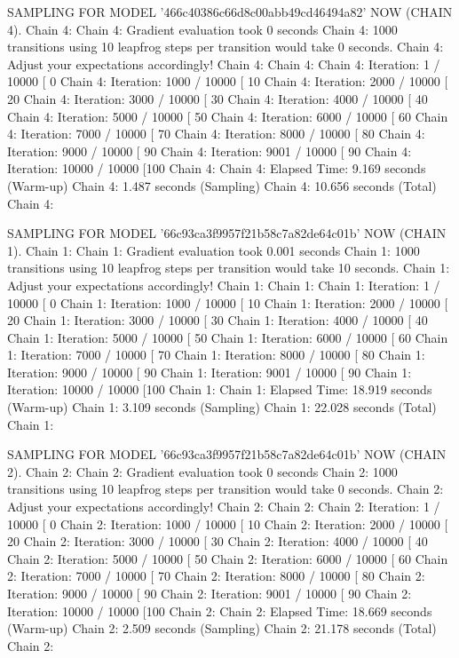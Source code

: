 \documentclass[
]{jss}
\begin{document}
\begin{CodeChunk}
\begin{CodeOutput}
SAMPLING FOR MODEL '466c40386c66d8c00abb49cd46494a82' NOW (CHAIN 4).
Chain 4: 
Chain 4: Gradient evaluation took 0 seconds
Chain 4: 1000 transitions using 10 leapfrog steps per transition would take 0 seconds.
Chain 4: Adjust your expectations accordingly!
Chain 4: 
Chain 4: 
Chain 4: Iteration:    1 / 10000 [  0%
Chain 4: Iteration: 1000 / 10000 [ 10%
Chain 4: Iteration: 2000 / 10000 [ 20%
Chain 4: Iteration: 3000 / 10000 [ 30%
Chain 4: Iteration: 4000 / 10000 [ 40%
Chain 4: Iteration: 5000 / 10000 [ 50%
Chain 4: Iteration: 6000 / 10000 [ 60%
Chain 4: Iteration: 7000 / 10000 [ 70%
Chain 4: Iteration: 8000 / 10000 [ 80%
Chain 4: Iteration: 9000 / 10000 [ 90%
Chain 4: Iteration: 9001 / 10000 [ 90%
Chain 4: Iteration: 10000 / 10000 [100%
Chain 4: 
Chain 4:  Elapsed Time: 9.169 seconds (Warm-up)
Chain 4:                1.487 seconds (Sampling)
Chain 4:                10.656 seconds (Total)
Chain 4: 

SAMPLING FOR MODEL '66c93ca3f9957f21b58c7a82de64c01b' NOW (CHAIN 1).
Chain 1: 
Chain 1: Gradient evaluation took 0.001 seconds
Chain 1: 1000 transitions using 10 leapfrog steps per transition would take 10 seconds.
Chain 1: Adjust your expectations accordingly!
Chain 1: 
Chain 1: 
Chain 1: Iteration:    1 / 10000 [  0%
Chain 1: Iteration: 1000 / 10000 [ 10%
Chain 1: Iteration: 2000 / 10000 [ 20%
Chain 1: Iteration: 3000 / 10000 [ 30%
Chain 1: Iteration: 4000 / 10000 [ 40%
Chain 1: Iteration: 5000 / 10000 [ 50%
Chain 1: Iteration: 6000 / 10000 [ 60%
Chain 1: Iteration: 7000 / 10000 [ 70%
Chain 1: Iteration: 8000 / 10000 [ 80%
Chain 1: Iteration: 9000 / 10000 [ 90%
Chain 1: Iteration: 9001 / 10000 [ 90%
Chain 1: Iteration: 10000 / 10000 [100%
Chain 1: 
Chain 1:  Elapsed Time: 18.919 seconds (Warm-up)
Chain 1:                3.109 seconds (Sampling)
Chain 1:                22.028 seconds (Total)
Chain 1: 

SAMPLING FOR MODEL '66c93ca3f9957f21b58c7a82de64c01b' NOW (CHAIN 2).
Chain 2: 
Chain 2: Gradient evaluation took 0 seconds
Chain 2: 1000 transitions using 10 leapfrog steps per transition would take 0 seconds.
Chain 2: Adjust your expectations accordingly!
Chain 2: 
Chain 2: 
Chain 2: Iteration:    1 / 10000 [  0%
Chain 2: Iteration: 1000 / 10000 [ 10%
Chain 2: Iteration: 2000 / 10000 [ 20%
Chain 2: Iteration: 3000 / 10000 [ 30%
Chain 2: Iteration: 4000 / 10000 [ 40%
Chain 2: Iteration: 5000 / 10000 [ 50%
Chain 2: Iteration: 6000 / 10000 [ 60%
Chain 2: Iteration: 7000 / 10000 [ 70%
Chain 2: Iteration: 8000 / 10000 [ 80%
Chain 2: Iteration: 9000 / 10000 [ 90%
Chain 2: Iteration: 9001 / 10000 [ 90%
Chain 2: Iteration: 10000 / 10000 [100%
Chain 2: 
Chain 2:  Elapsed Time: 18.669 seconds (Warm-up)
Chain 2:                2.509 seconds (Sampling)
Chain 2:                21.178 seconds (Total)
Chain 2: 


\end{CodeOutput}
\end{CodeChunk}
\end{document}
